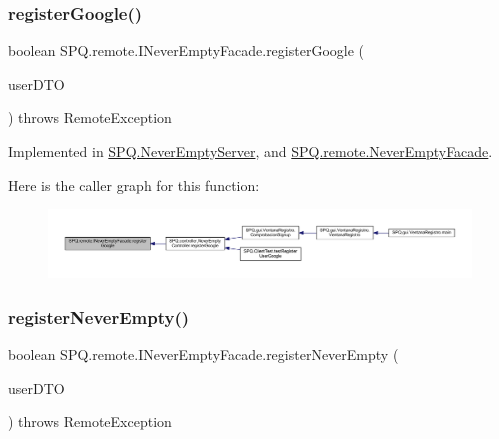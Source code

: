 \subsubsection{\texorpdfstring{register\+Google()}{registerGoogle()}}
{\footnotesize\ttfamily boolean S\+P\+Q.\+remote.\+I\+Never\+Empty\+Facade.\+register\+Google (\begin{DoxyParamCaption}\item[{\mbox{\hyperlink{class_s_p_q_1_1dto_1_1_user_d_t_o}{User\+D\+TO}}}]{user\+D\+TO }\end{DoxyParamCaption}) throws Remote\+Exception}



Implemented in \mbox{\hyperlink{class_s_p_q_1_1_never_empty_server_ac97355451c02fc378cb5d8f33f442ce6}{S\+P\+Q.\+Never\+Empty\+Server}}, and \mbox{\hyperlink{class_s_p_q_1_1remote_1_1_never_empty_facade_aaa8d4a6148957029af068d00da24890b}{S\+P\+Q.\+remote.\+Never\+Empty\+Facade}}.

Here is the caller graph for this function\+:\nopagebreak
\begin{figure}[H]
\begin{center}
\leavevmode
\includegraphics[width=350pt]{interface_s_p_q_1_1remote_1_1_i_never_empty_facade_a93f3250c09a26fdb1d65219599dfd542_icgraph}
\end{center}
\end{figure}
\mbox{\label{interface_s_p_q_1_1remote_1_1_i_never_empty_facade_a7867e1e698fea32a535a1daeda4e8d6a}} 
\subsubsection{\texorpdfstring{register\+Never\+Empty()}{registerNeverEmpty()}}
{\footnotesize\ttfamily boolean S\+P\+Q.\+remote.\+I\+Never\+Empty\+Facade.\+register\+Never\+Empty (\begin{DoxyParamCaption}\item[{\mbox{\hyperlink{class_s_p_q_1_1dto_1_1_user_d_t_o}{User\+D\+TO}}}]{user\+D\+TO }\end{DoxyParamCaption}) throws Remote\+Exception}



